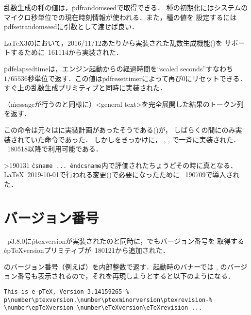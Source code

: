 \documentclass[a4paper,11pt,nomag]{jsarticle}
\begin{document}
\begin{cslist}
  乱数生成の種の値は，\.{pdfrandomseed}で取得できる．
  種の初期化にはシステムのマイクロ秒単位での現在時刻情報が使われる．また，種の値を
  設定するには\.{pdfsetrandomseed}に引数として渡せば良い．

  \LaTeX3のにおいて，2016/11/12あたりから実装された乱数生成機能(\cite{random})を
  サポートするために\epTeX~161114から実装された．

  \.{pdfelapsedtime}は，エンジン起動からの経過時間を``scaled seconds''すなわち
  $1/65536$秒単位で返す．この値は\.{pdfresettimer}によって再び0にリセットできる．
  すぐ上の乱数生成プリミティブと同時に実装された．

  （\.{message}が行うのと同様に）<general text>を完全展開した結果のトークン列を返す．

  この命令は元々はに実装計画があったそうである(\cite{expanded})が，
  しばらくの間にのみ実装されていた命令であった．
  しかし\cite{expanded1}をきっかけに，
  , \epTeX, で一斉に実装された．
  \epTeX~180518以降で利用可能である．

\ifnum\epTeXversion>190131 %
  \csitem[\.{ifincsname}]
  \texttt{\.{csname}~...~\.{endcsname}}内で評価されたちょうどその時に真となる．
  \LaTeX~2019-10-01で行われる変更(\cite{latex95,tjb83})で必要になったために
  \epTeX~190709で導入された．
\fi %
\end{cslist}

\section{バージョン番号}
\pTeX~p3.8.0に\.{ptexversion}が実装されたのと同時に，\epTeX でもバージョン番号を
取得する\.{epTeXversion}プリミティブが\epTeX~180121から追加された．

\begin{cslist}
  \epTeX のバージョン番号（例えば\the\epTeXversion）を内部整数で返す．\epTeX 起動時のバナーでは
  \eTeX, \pTeX のバージョン番号も表示されるので，それを再現しようとすると以下のようになる．
\begin{verbatim}
This is e-pTeX, Version 3.14159265-%
p\number\ptexversion.\number\ptexminorversion\ptexrevision-%
\number\epTeXversion-\number\eTeXversion\eTeXrevision ...
\end{verbatim}


\end{cslist}
\end{document}
